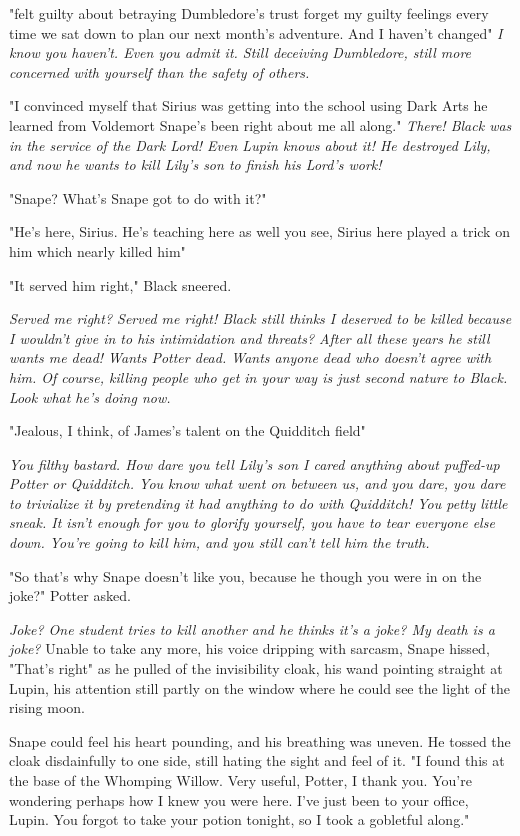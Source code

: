 "{\el}felt guilty about betraying Dumbledore's trust{\el} forget my guilty feelings every time we sat down to plan our next month's adventure. And I haven't changed{\el}" \emph{I know you haven't. Even you admit it. Still deceiving Dumbledore, still more concerned with yourself than the safety of others.}

"{\el}I convinced myself that Sirius was getting into the school using Dark Arts he learned from Voldemort{\el} Snape's been right about me all along." \emph{There! Black was in the service of the Dark Lord! Even Lupin knows about it! He destroyed Lily, and now he wants to kill Lily's son to finish his Lord's work!}

"Snape? What's Snape got to do with it?"

"He's here, Sirius. He's teaching here as well{\el} you see, Sirius here played a trick on him which nearly killed him{\el}"

"It served him right," Black sneered.

\emph{Served me right? Served me right! Black still thinks I deserved to be killed because I wouldn't give in to his intimidation and threats? After all these years he still wants me dead! Wants Potter dead. Wants anyone dead who doesn't agree with him. Of course, killing people who get in your way is just second nature to Black. Look what he's doing now.}

"{\el}Jealous, I think, of James's talent on the Quidditch field{\el}"

\emph{You filthy bastard. How dare you tell Lily's son I cared anything about puffed-up Potter or Quidditch. You know what went on between us, and you dare, you dare to trivialize it by pretending it had anything to do with Quidditch! You petty little sneak. It isn't enough for you to glorify yourself, you have to tear everyone else down. You're going to kill him, and you still can't tell him the truth.}

"So that's why Snape doesn't like you, because he though you were in on the joke?" Potter asked.

\emph{Joke? One student tries to kill another and he thinks it's a joke? My death is a joke?} Unable to take any more, his voice dripping with sarcasm, Snape hissed, "That's right" as he pulled of the invisibility cloak, his wand pointing straight at Lupin, his attention still partly on the window where he could see the light of the rising moon.

Snape could feel his heart pounding, and his breathing was uneven. He tossed the cloak disdainfully to one side, still hating the sight and feel of it. "I found this at the base of the Whomping Willow. Very useful, Potter, I thank you. You're wondering perhaps how I knew you were here. I've just been to your office, Lupin. You forgot to take your potion tonight, so I took a gobletful along."

